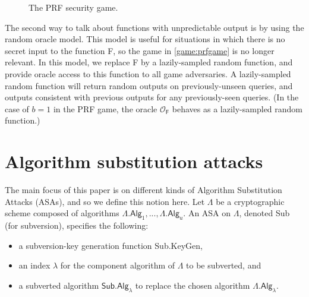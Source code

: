 \begin{figure}
\centering
\begin{pchstack}
\pchspace
{}
\end{pchstack}
\caption{The PRF security game.}
\label{game:prfgame}
\end{figure}

The second way to talk about functions with unpredictable output is by using the random oracle model. This model is useful for situations in which there is no secret input to the function \textsf{F}, so the game in \autoref{game:prfgame} is no longer relevant. In this model, we replace \textsf{F} by a lazily-sampled random function, and provide oracle access to this function to all game adversaries. A lazily-sampled random function will return random outputs on previously-unseen queries, and outputs consistent with previous outputs for any previously-seen queries. (In the case of $b=1$ in the PRF game, the oracle $\mathcal{O}_\mathsf{F}$ behaves as a lazily-sampled random function.)

\section{Algorithm substitution attacks}

The main focus of this paper is on different kinds of Algorithm Substitution Attacks (ASAs), and so we define this notion here. Let $\mathsf{\Lambda}$ be a cryptographic scheme composed of algorithms $\mathsf{\Lambda.Alg}_1,..., \mathsf{\Lambda.Alg}_u$. An ASA on $\mathsf{\Lambda}$, denoted \textsf{Sub} (for subversion), specifies the following:
\begin{itemize}
\item a subversion-key generation function \textsf{Sub.KeyGen},
\item an index $\lambda$ for the component algorithm of $\mathsf{\Lambda}$ to be subverted, and
\item a subverted algorithm $\mathsf{Sub.Alg}_\lambda$ to replace the chosen algorithm $\mathsf{\Lambda.Alg}_\lambda$.
\end{itemize}

